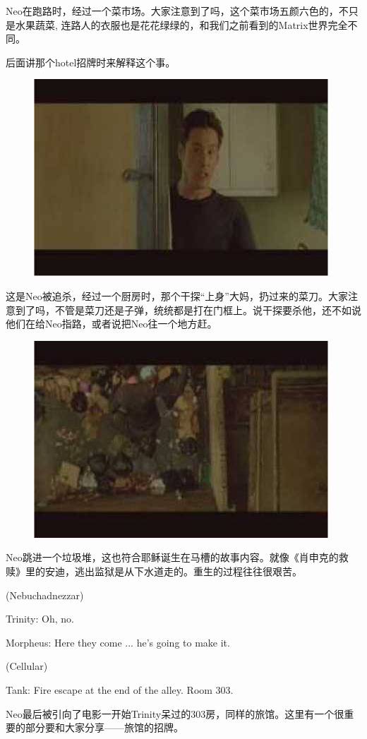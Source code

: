 \documentclass[UTF8]{ctexart}
\newenvironment{myquote}{\color{green} \setlength{\leftskip}{6em} \setlength{\rightskip}{4em} \setlength{\parindent}{-2em}}{\par}
\begin{document}
Neo在跑路时，经过一个菜市场。大家注意到了吗，这个菜市场五颜六色的，不只是水果蔬菜, 连路人的衣服也是花花绿绿的，和我们之前看到的Matrix世界完全不同。

后面讲那个hotel招牌时来解释这个事。

\begin{figure}[htb]
\centering
\includegraphics[width=0.5\linewidth]{fig/read_Matrix-79}
\end{figure}

这是Neo被追杀，经过一个厨房时，那个干探“上身”大妈，扔过来的菜刀。大家注意到了吗，不管是菜刀还是子弹，统统都是打在门框上。说干探要杀他，还不如说他们在给Neo指路，或者说把Neo往一个地方赶。

\begin{figure}[htb]
\centering
\includegraphics[width=0.5\linewidth]{fig/read_Matrix-80}
\end{figure}

Neo跳进一个垃圾堆，这也符合耶稣诞生在马槽的故事内容。就像《肖申克的救赎》里的安迪，逃出监狱是从下水道走的。重生的过程往往很艰苦。

\begin{myquote}
(Nebuchadnezzar)

Trinity: Oh, no.

Morpheus: Here they come ... he's going to make it.

(Cellular)

Tank: Fire escape at the end of the alley. Room 303.
\end{myquote}

Neo最后被引向了电影一开始Trinity呆过的303房，同样的旅馆。这里有一个很重要的部分要和大家分享——旅馆的招牌。
\end{document}
